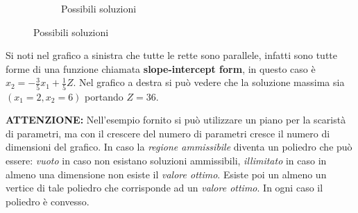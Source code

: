 \documentclass{article}
\begin{document}
\begin{figure}[ht]
\begin{subfigure}[b]{0.45\textwidth}
          \caption{Possibili soluzioni}
        \end{subfigure}

      \end{figure}

      Si noti nel grafico a sinistra che tutte le rette sono parallele, infatti sono tutte forme di una funzione chiamata \textbf{slope-intercept form}, in questo caso è $x_2=-\frac{3}{5}x_1+\frac{1}{5}Z$. Nel grafico a destra si può vedere che la soluzione massima sia $(x_1=2,x_2=6)$ portando $Z=36$.
  
    \begin{tcolorbox}
      \textbf{ATTENZIONE:}
        Nell'esempio fornito si può utilizzare un piano per la scaristà di parametri, ma con il crescere del numero di parametri cresce il numero di dimensioni del grafico. In caso la \textit{regione ammissibile} diventa un poliedro che può essere: \textit{vuoto} in caso non esistano soluzioni ammissibili, \textit{illimitato} in caso in almeno una dimensione non esiste il \textit{valore ottimo}. Esiste poi un almeno un vertice di tale poliedro che corrisponde ad un \textit{valore ottimo}. In ogni caso il poliedro è convesso.
      
    \end{tcolorbox}
\end{document}
